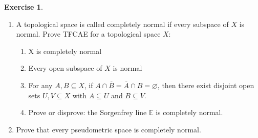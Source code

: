 \documentclass[12pt]{extarticle}
\newcommand{\<}{\langle}
\renewcommand{\>}{\rangle}
\renewcommand{\emptyset}{\varnothing}
\theoremstyle{definition}
\newtheorem{exercise}{Exercise}
\begin{document}
\begin{exercise}
  \begin{enumerate}
  \item
    A topological space is called completely normal if every subspace of $X$ is normal. Prove TFCAE for a topological space $X$:
    \begin{enumerate}
    \item X is completely normal
    \item Every open subspace of $X$ is normal
    \item For any $A,B \subseteq X$, if $A \cap \overline{B} = \overline{A} \cap B = \emptyset$, then there exist disjoint open sets $U,V \subseteq X$ with $A \subseteq U$ and $B \subseteq V$.
    \item
      Prove or disprove: the Sorgenfrey line $\mathbb{E}$ is completely normal. 
    \end{enumerate}
  \item
    Prove that every pseudometric space is completely normal. 
  \end{enumerate}
\end{exercise}
\end{document}
